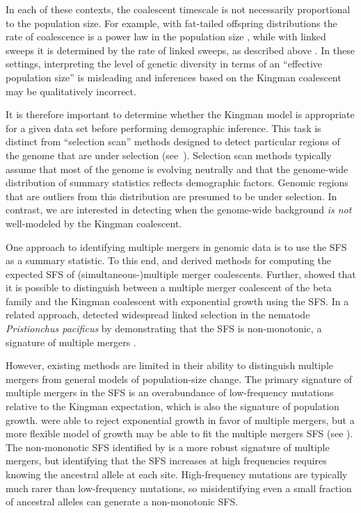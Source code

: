 \documentclass[11pt, letterpaper]{article}   	%
\begin{document}
In each of these contexts, the coalescent timescale is not necessarily proportional to the population size.
For example, with fat-tailed offspring distributions the rate of coalescence is a power law in the population size \autocite{Schweinsberg2003}, while with linked sweeps it is determined by the rate of linked sweeps, as described above \autocite{DurrettSchweinsberg2005}.
In these settings, interpreting the level of genetic diversity in terms of an ``effective population size'' is misleading and inferences based on the Kingman coalescent may be qualitatively incorrect.

It is therefore important to determine whether the Kingman model is appropriate for a given data set before performing demographic inference.
This task is distinct from ``selection scan'' methods designed to detect particular regions of the genome that are under selection (see~\cite{VittiEtAl2013}).
Selection scan methods typically assume that most of the genome is evolving neutrally and that the genome-wide distribution of summary statistics reflects demographic factors.
Genomic regions that are outliers from this distribution are presumed to be under selection.
In contrast, we are interested in detecting when the genome-wide background \emph{is not} well-modeled by the Kingman coalescent.

One approach to identifying multiple mergers in genomic data is to use the SFS as a summary statistic.
To this end, \textcite{BirknerEtAl2013, BlathEtAl2016} and \textcite{SpenceEtAl2016} derived methods for computing the expected SFS of (simultaneous-)multiple merger coalescents.
Further, \textcite{EldonEtAl2015} showed that it is possible to distinguish between a multiple merger coalescent of the beta family and the Kingman coalescent with exponential growth using the SFS.
In a related approach, \textcite{RodelspergerEtAl2014} detected widespread linked selection in the nematode \textit{Pristionchus pacificus} by demonstrating that the SFS is non-monotonic, a signature of multiple mergers \autocite{NeherHallatschek2013, BirknerEtAl2013}.

However, existing methods are limited in their ability to distinguish multiple mergers from general models of population-size change.
The primary signature of multiple mergers in the SFS is an overabundance of low-frequency mutations relative to the Kingman expectation, which is also the signature of population growth.
\textcite{EldonEtAl2015} were able to reject exponential growth in favor of multiple mergers, but a more flexible model of growth may be able to fit the multiple mergers SFS (see \cite{MyersEtAl2008, BhaskarSong2014}).
The non-mononotic SFS identified by \textcite{RodelspergerEtAl2014} is a more robust signature of multiple mergers, but identifying that the SFS increases at high frequencies requires knowing the ancestral allele at each site.
High-frequency mutations are typically much rarer than low-frequency mutations, so misidentifying even a small fraction of ancestral alleles can generate a non-monotonic SFS.
\end{document}
